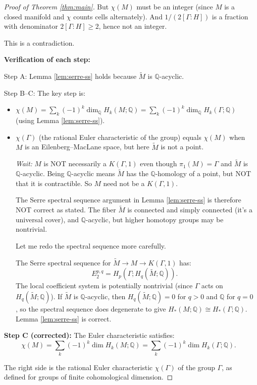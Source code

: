 \documentclass[12pt]{article}
\begin{document}
\begin{proof}[Proof of Theorem \ref{thm:main}]
But $\chi(M)$ must be an integer (since $M$ is a closed manifold and $\chi$ counts cells alternately). And $1/(2[\Gamma:H])$ is a fraction with denominator $2[\Gamma:H] \geq 2$, hence not an integer.

This is a contradiction.

\textbf{Verification of each step:}

Step A: Lemma \ref{lem:serre-ss} holds because $\widetilde{M}$ is $\mathbb{Q}$-acyclic.

Step B--C: The key step is:
\begin{itemize}
\item $\chi(M) = \sum_k (-1)^k \dim_\mathbb{Q} H_k(M; \mathbb{Q}) = \sum_k (-1)^k \dim_\mathbb{Q} H_k(\Gamma; \mathbb{Q})$ (using Lemma \ref{lem:serre-ss}).
\item $\chi(\Gamma)$ (the rational Euler characteristic of the group) equals $\chi(M)$ when $M$ is an Eilenberg--MacLane space, but here $\widetilde{M}$ is not a point.

\emph{Wait:} $M$ is NOT necessarily a $K(\Gamma,1)$ even though $\pi_1(M) = \Gamma$ and $\widetilde{M}$ is $\mathbb{Q}$-acyclic. Being $\mathbb{Q}$-acyclic means $\widetilde{M}$ has the $\mathbb{Q}$-homology of a point, but NOT that it is contractible. So $M$ need not be a $K(\Gamma,1)$.

The Serre spectral sequence argument in Lemma \ref{lem:serre-ss} is therefore NOT correct as stated. The fiber $\widetilde{M}$ is connected and simply connected (it's a universal cover), and $\mathbb{Q}$-acyclic, but higher homotopy groups may be nontrivial.

Let me redo the spectral sequence more carefully.

The Serre spectral sequence for $\widetilde{M} \to M \to K(\Gamma,1)$ has:
\[
E_2^{p,q} = H_p(\Gamma; H_q(\widetilde{M}; \mathbb{Q})).
\]
The local coefficient system is potentially nontrivial (since $\Gamma$ acts on $H_q(\widetilde{M};\mathbb{Q})$). If $\widetilde{M}$ is $\mathbb{Q}$-acyclic, then $H_q(\widetilde{M}; \mathbb{Q}) = 0$ for $q > 0$ and $\mathbb{Q}$ for $q = 0$, so the spectral sequence does degenerate to give $H_*(M;\mathbb{Q}) \cong H_*(\Gamma;\mathbb{Q})$. Lemma \ref{lem:serre-ss} is correct.
\end{itemize}

\textbf{Step C (corrected):} The Euler characteristic satisfies:
\[
\chi(M) = \sum_k (-1)^k \dim H_k(M; \mathbb{Q}) = \sum_k (-1)^k \dim H_k(\Gamma; \mathbb{Q}).
\]

The right side is the rational Euler characteristic $\chi(\Gamma)$ of the group $\Gamma$, as defined for groups of finite cohomological dimension.


\end{proof}
\end{document}
